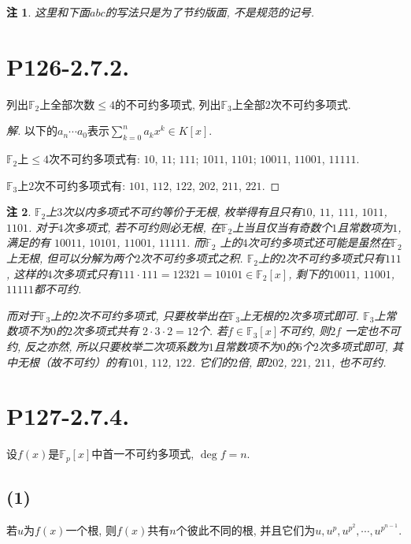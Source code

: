 \documentclass[12pt, a4paper, fontset=windows]{ctexart}
\newcommand{\F}{\mathbb{F}}
\newcommand{\kh}[1]{（{#1}）} %
\newtheorem*{remark}{注}
\newenvironment{solution}{\begin{proof}[解]}{\end{proof}}
\begin{document}
\begin{remark}
这里和下面$abc$的写法只是为了节约版面, 不是规范的记号. 
\end{remark}

\section*{P126-2.7.2.}
\label{enum-irr}

列出$\F_2$上全部次数$\le 4$的不可约多项式, 
列出$\F_3$上全部$2$次不可约多项式. 

\begin{solution}
以下的$a_n\cdots a_0$表示$\sum^n_{k=0}a_kx^k\in K[x]$. 

$\F_2$上$\le 4$次不可约多项式有: $10$, $11$; $111$; 
$1011$, $1101$; $10011$, $11001$, $11111$. 

$\F_3$上$2$次不可约多项式有: 
$101$, $112$, $122$, $202$, $211$, $221$. 
\end{solution}

\begin{remark}
$\F_2$上$3$次以内多项式不可约等价于无根, 枚举得有且只有$10$, 
$11$, $111$, $1011$, $1101$. 对于$4$次多项式, 若不可约则必无根, 
在$\F_2$上当且仅当有奇数个$1$且常数项为$1$, 满足的有
$10011$, $10101$, $11001$, $11111$. 而$\F_2$
上的$4$次可约多项式还可能是虽然在$\F_2$上无根, 
但可以分解为两个$2$次不可约多项式之积. 
$\F_2$上的$2$次不可约多项式只有$111$, 
这样的$4$次多项式只有$111\cdot 111=12321=10101\in\F_2[x]$, 
剩下的$10011$, $11001$, $11111$都不可约. 

而对于$\F_3$上的$2$次不可约多项式, 
只要枚举出在$\F_3$上无根的$2$次多项式即可. 
$\F_3$上常数项不为$0$的$2$次多项式共有
$2\cdot 3\cdot 2=12$个. 若$f\in\F_3[x]$不可约, 则$2f$
一定也不可约, 反之亦然, 
所以只要枚举二次项系数为$1$且常数项不为$0$的$6$个$2$次多项式即可, 
其中无根\kh{故不可约}的有$101$, $112$, $122$. 
它们的$2$倍, 即$202$, $221$, $211$, 也不可约. 
\end{remark}

\section*{P127-2.7.4.}

设$f(x)$是$\F_p[x]$中首一不可约多项式, $\deg f=n$. 

\subsection*{(1)}

若$u$为$f(x)$一个根, 则$f(x)$共有$n$个彼此不同的根, 
并且它们为$u,u^p,u^{p^2},\cdots,u^{p^{n-1}}$. 
\end{document}
